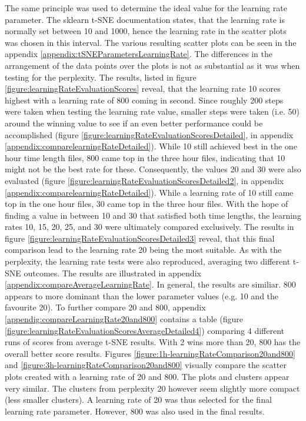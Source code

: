 The same principle was used to determine the ideal value for the learning rate parameter. The sklearn t-SNE documentation states, that the learning rate is normally set between 10 and 1000, hence the learning rate in the scatter plots was chosen in this interval.
The various resulting scatter plots can be seen in the appendix \ref{appendix:tSNEParametersLearningRate}. The differences in the arrangement of the data points over the plots is not as substantial as it was when testing for the perplexity. The results, listed in figure \ref{figure:learningRateEvaluationScores} reveal, that the learning rate 10 scores highest with a learning rate of 800 coming in second. Since roughly 200 steps were taken when testing the learning rate value, smaller steps were taken (i.e. 50) around the winning value to see if an even better performance could be accomplished (figure \ref{figure:learningRateEvaluationScoresDetailed}, in appendix \ref{appendix:comparelearningRateDetailed}). While 10 still achieved best in the one hour time length files, 800 came top in the three hour files, indicating that 10 might not be the best rate for these. Consequently, the values 20 and 30 were also evaluated (figure \ref{figure:learningRateEvaluationScoresDetailed2}, in appendix \ref{appendix:comparelearningRateDetailed}). While a learning rate of 10 still came top in the one hour files, 30 came top in the three hour files. With the hope of finding a value in between 10 and 30 that satisfied both time lengths, the learning rates 10, 15, 20, 25, and 30 were ultimately compared exclusively. The results in figure \ref{figure:learningRateEvaluationScoresDetailed3} reveal, that this final comparison lead to the learning rate 20 being the most suitable. As with the perplexity, the learning rate tests were also reproduced, averaging two different t-SNE outcomes. The results are illustrated in appendix \ref{appendix:compareAverageLearningRate}. In general, the results are similiar. 800 appears to more dominant than the lower parameter values (e.g. 10 and the favourite 20). To further compare 20 and 800, appendix \ref{appendig:compareLearningRate20and800} contains a table (figure \ref{figure:learningRateEvaluationScoresAverageDetailed4}) comparing 4 different runs of scores from average t-SNE results. With 2 wins more than 20, 800 has the overall better score results. Figures \ref{figure:1h-learningRateComparison20and800} and \ref{figure:3h-learningRateComparison20and800} visually compare the scatter plots created with a learning rate of 20 and 800. The plots and clusters appear very similar. The clusters from perplexity 20 however seem slightly more compact (less smaller clusters). A learning rate of 20 was thus selected for the final learning rate parameter. However, 800 was also used in the final results.

